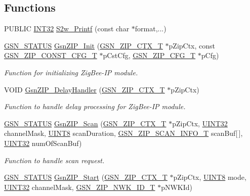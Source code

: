 \subsection*{Functions}
\begin{DoxyCompactItemize}
\item 
PUBLIC \hyperlink{a00660_ga63021d67d54286c2163bcdb43a6f2569}{INT32} \hyperlink{a00618_a8ac6076b35c3615f6c862c8c2d818143}{S2w\_\-Printf} (const char $\ast$format,...)
\item 
\hyperlink{a00660_gada5951904ac6110b1fa95e51a9ddc217}{GSN\_\-STATUS} \hyperlink{a00618_a4168ecae5684e5ccdcbcc960b63d5982}{GsnZIP\_\-Init} (\hyperlink{a00440}{GSN\_\-ZIP\_\-CTX\_\-T} $\ast$pZipCtx, const \hyperlink{a00439}{GSN\_\-ZIP\_\-CONST\_\-CFG\_\-T} $\ast$pCstCfg, \hyperlink{a00438}{GSN\_\-ZIP\_\-CFG\_\-T} $\ast$pCfg)
\begin{DoxyCompactList}\small\item\em Function for initializing ZigBee-\/IP module. \end{DoxyCompactList}\item 
VOID \hyperlink{a00618_a157c76347af4ae8d2726352426b04ec0}{GsnZIP\_\-DelayHandler} (\hyperlink{a00440}{GSN\_\-ZIP\_\-CTX\_\-T} $\ast$pZipCtx)
\begin{DoxyCompactList}\small\item\em Function to handle delay processing for ZigBee-\/IP module. \end{DoxyCompactList}\item 
\hyperlink{a00660_gada5951904ac6110b1fa95e51a9ddc217}{GSN\_\-STATUS} \hyperlink{a00618_a3196be3a944ca07b6dce20e70d39dbff}{GsnZIP\_\-Scan} (\hyperlink{a00440}{GSN\_\-ZIP\_\-CTX\_\-T} $\ast$pZipCtx, \hyperlink{a00660_gae1e6edbbc26d6fbc71a90190d0266018}{UINT32} channelMask, \hyperlink{a00660_gab27e9918b538ce9d8ca692479b375b6a}{UINT8} scanDuration, \hyperlink{a00442}{GSN\_\-ZIP\_\-SCAN\_\-INFO\_\-T} scanBuf\mbox{[}$\,$\mbox{]}, \hyperlink{a00660_gae1e6edbbc26d6fbc71a90190d0266018}{UINT32} numOfScanBuf)
\begin{DoxyCompactList}\small\item\em Function to handle scan request. \end{DoxyCompactList}\item 
\hyperlink{a00660_gada5951904ac6110b1fa95e51a9ddc217}{GSN\_\-STATUS} \hyperlink{a00618_ae3589bc9e7a07d3cee7d9ec0a18fb0fc}{GsnZIP\_\-Start} (\hyperlink{a00440}{GSN\_\-ZIP\_\-CTX\_\-T} $\ast$pZipCtx, \hyperlink{a00660_gab27e9918b538ce9d8ca692479b375b6a}{UINT8} mode, \hyperlink{a00660_gae1e6edbbc26d6fbc71a90190d0266018}{UINT32} channelMask, \hyperlink{a00441}{GSN\_\-ZIP\_\-NWK\_\-ID\_\-T} $\ast$pNWKId)

\end{DoxyCompactItemize}
